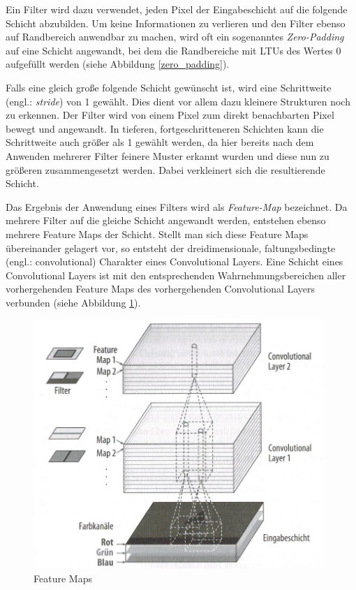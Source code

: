 Ein Filter wird dazu verwendet, jeden Pixel der Eingabeschicht auf die folgende Schicht abzubilden. Um keine Informationen zu verlieren und den Filter ebenso auf Randbereich anwendbar zu machen, wird oft ein sogenanntes \textit{Zero-Padding} auf eine Schicht angewandt, bei dem die Randbereiche mit LTUs des Wertes 0 aufgefüllt werden (siehe Abbildung \ref{zero_padding}). \cite{AurelienGeron.2018}

Falls eine gleich große folgende Schicht gewünscht ist, wird eine Schrittweite (engl.: \textit{stride}) von 1 gewählt. Dies dient vor allem dazu kleinere Strukturen noch zu erkennen. Der Filter wird von einem Pixel zum direkt benachbarten Pixel bewegt und angewandt. In tieferen, fortgeschritteneren Schichten kann die Schrittweite auch größer als 1 gewählt werden, da hier bereits nach dem Anwenden mehrerer Filter feinere Muster erkannt wurden und diese nun zu größeren zusammengesetzt werden. Dabei verkleinert sich die resultierende Schicht. \cite{AurelienGeron.2018}

Das Ergebnis der Anwendung eines Filters wird als \textit{Feature-Map} bezeichnet. Da mehrere Filter auf die gleiche Schicht angewandt werden, entstehen ebenso mehrere Feature Maps der Schicht. Stellt man sich diese Feature Maps übereinander gelagert vor, so entsteht der dreidimensionale, \glqq faltungsbedingte\grqq{} (engl.: convolutional) Charakter eines Convolutional Layers. Eine Schicht eines Convolutional Layers ist mit den entsprechenden Wahrnehmungsbereichen aller vorhergehenden Feature Maps des vorhergehenden Convolutional Layers verbunden (siehe Abbildung \ref{feature_maps}). \cite{AurelienGeron.2018}

\begin{figure}[ht]
	\begin{center}
		\includegraphics[width=11cm]{Bilder/feature_maps.jpeg} 
		\caption[Feature Maps]{Feature Maps \cite{AurelienGeron.2018}}
		\label{feature_maps}
	\end{center}
\end{figure}

